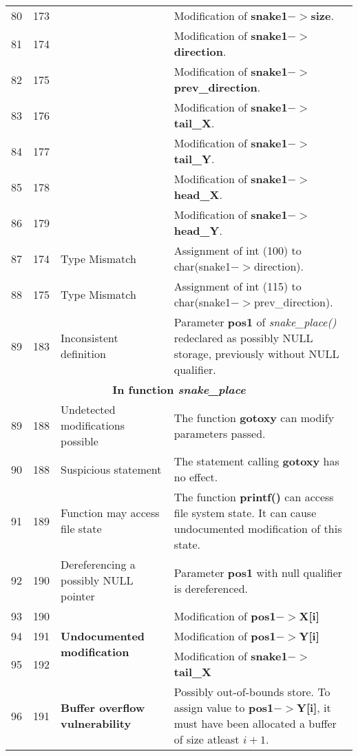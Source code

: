 \documentclass[]{article}
\begin{document}
\begin{longtable}{ |p{0.5cm}|p{0.75cm}|p{3cm}|p{9cm}|  }
		80 & 173 & & Modification of \textbf{snake1$->$size}. \\
		81 & 174 & & Modification of \textbf{snake1$->$direction}. \\
		82 & 175 & & Modification of \textbf{snake1$->$prev\_direction}. \\
		83 & 176 & & Modification of \textbf{snake1$->$tail\_X}. \\
		84 & 177 & & Modification of \textbf{snake1$->$tail\_Y}. \\
		85 & 178 & & Modification of \textbf{snake1$->$head\_X}. \\
		86 & 179 & & Modification of \textbf{snake1$->$head\_Y}. \\
		\hline 
		87 & 174 & Type Mismatch & Assignment of int (100) to char(snake1$->$direction). \\
		\hline 
		88 & 175 & Type Mismatch & Assignment of int (115) to char(snake1$->$prev\_direction). \\
		\hline 
		89 & 183 & Inconsistent definition & Parameter \textbf{pos1} of \textit{snake\_place()} redeclared as possibly NULL storage, previously without NULL qualifier. \\
		\hline 
		\multicolumn{4}{|c|}{\textbf{In function \textit{snake\_place}}} \\
		\hline 
		89 & 188 & Undetected modifications possible & The function \textbf{gotoxy} can modify parameters passed. \\
		\hline 
		90 & 188 & Suspicious statement & The statement calling \textbf{gotoxy} has no effect. \\
		\hline 
		91 & 189 & Function may access file state & The function \textbf{printf()} can access file system state. It can cause undocumented modification of this state. \\
		\hline 
		92 & 190 & Dereferencing a possibly NULL pointer & Parameter \textbf{pos1} with null qualifier is dereferenced. \\
		\hline 
		93 & 190 & \multirow{3}{90.0pt}{\textbf{Undocumented modification}} & Modification of \textbf{pos1$->$X[i]} \\
		94 & 191 & & Modification of \textbf{pos1$->$Y[i]} \\ 
		95 & 192 & & Modification of \textbf{snake1$->$tail\_X} \\
		\hline 
		96 & 191 & \textbf{Buffer overflow vulnerability} & Possibly out-of-bounds store. To assign value to \textbf{pos1$->$Y[i]}, it must have been allocated a buffer of size atleast $i + 1$.  \\
		

\end{longtable}
\end{document}

